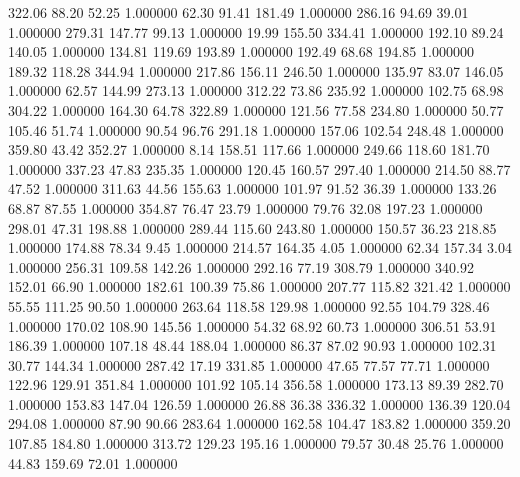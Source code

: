     322.06     88.20     52.25  1.000000
     62.30     91.41    181.49  1.000000
    286.16     94.69     39.01  1.000000
    279.31    147.77     99.13  1.000000
     19.99    155.50    334.41  1.000000
    192.10     89.24    140.05  1.000000
    134.81    119.69    193.89  1.000000
    192.49     68.68    194.85  1.000000
    189.32    118.28    344.94  1.000000
    217.86    156.11    246.50  1.000000
    135.97     83.07    146.05  1.000000
     62.57    144.99    273.13  1.000000
    312.22     73.86    235.92  1.000000
    102.75     68.98    304.22  1.000000
    164.30     64.78    322.89  1.000000
    121.56     77.58    234.80  1.000000
     50.77    105.46     51.74  1.000000
     90.54     96.76    291.18  1.000000
    157.06    102.54    248.48  1.000000
    359.80     43.42    352.27  1.000000
      8.14    158.51    117.66  1.000000
    249.66    118.60    181.70  1.000000
    337.23     47.83    235.35  1.000000
    120.45    160.57    297.40  1.000000
    214.50     88.77     47.52  1.000000
    311.63     44.56    155.63  1.000000
    101.97     91.52     36.39  1.000000
    133.26     68.87     87.55  1.000000
    354.87     76.47     23.79  1.000000
     79.76     32.08    197.23  1.000000
    298.01     47.31    198.88  1.000000
    289.44    115.60    243.80  1.000000
    150.57     36.23    218.85  1.000000
    174.88     78.34      9.45  1.000000
    214.57    164.35      4.05  1.000000
     62.34    157.34      3.04  1.000000
    256.31    109.58    142.26  1.000000
    292.16     77.19    308.79  1.000000
    340.92    152.01     66.90  1.000000
    182.61    100.39     75.86  1.000000
    207.77    115.82    321.42  1.000000
     55.55    111.25     90.50  1.000000
    263.64    118.58    129.98  1.000000
     92.55    104.79    328.46  1.000000
    170.02    108.90    145.56  1.000000
     54.32     68.92     60.73  1.000000
    306.51     53.91    186.39  1.000000
    107.18     48.44    188.04  1.000000
     86.37     87.02     90.93  1.000000
    102.31     30.77    144.34  1.000000
    287.42     17.19    331.85  1.000000
     47.65     77.57     77.71  1.000000
    122.96    129.91    351.84  1.000000
    101.92    105.14    356.58  1.000000
    173.13     89.39    282.70  1.000000
    153.83    147.04    126.59  1.000000
     26.88     36.38    336.32  1.000000
    136.39    120.04    294.08  1.000000
     87.90     90.66    283.64  1.000000
    162.58    104.47    183.82  1.000000
    359.20    107.85    184.80  1.000000
    313.72    129.23    195.16  1.000000
     79.57     30.48     25.76  1.000000
     44.83    159.69     72.01  1.000000
